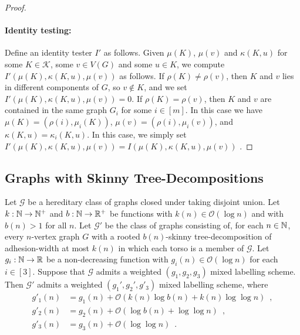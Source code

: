 \documentclass{patmorin}
\newcommand{\david}[1]{\noindent{\color{orange} DW: #1}}
\newcommand{\Oh}{\mathcal{O}}
\begin{document}
\begin{proof}
    \paragraph{Identity testing:}
    Define an identity tester $I'$ as follows.
    Given $\mu(K)$, $\mu(v)$ and $\kappa(K,u)$ for some $K\in\mathcal{K}$, some $v\in V(G)$ and some $u\in K$, we compute $I'(\mu(K),\kappa(K,u),\mu(v))$ as follows.
    If $\rho(K)\neq\rho(v)$, then $K$ and $v$ lies in different components of $G$, so $v\not\in K$, and we set $I'(\mu(K),\kappa(K,u),\mu(v))=0$.
    If $\rho(K)=\rho(v)$, then $K$ and $v$ are contained in the same graph $G_i$ for some $i\in[m]$. In this case we have
    $\mu(K)=(\rho(i),\mu_i(K))$,
    $\mu(v)=(\rho(i),\mu_i(v))$, and
    $\kappa(K,u)=\kappa_i(K,u)$.
    In this case, we simply set $I'(\mu(K),\kappa(K,u),\mu(v))=I(\mu(K),\kappa(K,u),\mu(v))$ \david{use := instead of = ?}.
  \end{proof}


\subsection{Graphs with Skinny Tree-Decompositions}

  \begin{lem}\label{skinny_labelling}
    Let $\mathcal{G}$ be a hereditary class of graphs closed under taking  disjoint union.
    Let $k:\mathbb{N}\to\mathbb{N}^+$ and $b:\mathbb{N}\to\mathbb{R}^+$ be functions with $k(n)\in\Oh(\log n)$ and with $b(n)>1$ for all $n$.
    Let $\mathcal{G}'$ be the class of graphs consisting of, for each $n\in\mathbb{N}$, every $n$-vertex graph $G$ with a rooted $b(n)$-skinny tree-decomposition of adhesion-width at most $k(n)$ in which each torso is a member of $\mathcal{G}$.
    Let $g_i:\mathbb{N}\to\mathbb{R}$ be a non-decreasing function with $g_i(n)\in \Oh(\log n)$ for each $i\in[3]$.
    Suppose that $\mathcal{G}$ admits a weighted $(g_1,g_2,g_3)$ mixed labelling scheme.
    Then $\mathcal{G}'$ admits a weighted $(g_1',g_2',g'_3)$ mixed labelling scheme, where
    \begin{align*}
     g'_1(n) & = g_1(n) + \Oh(k(n)\log b(n) + k(n) \log\log n)\enspace,  \\
     g'_2(n) & = g_2(n)+\Oh(\log b(n)+\log\log n)\enspace, \\
     g'_3(n) & = g_3(n) + \Oh(\log\log n)\enspace.
     \end{align*}
  \end{lem}
\end{document}
